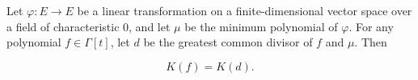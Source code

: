 Let $\varphi: E \to E$ be a linear transformation on a finite-dimensional vector space over a field of characteristic $0$, and let $\mu$ be the minimum polynomial of $\varphi$. For any polynomial $f \in \Gamma[t]$, let $d$ be the greatest common divisor of $f$ and $\mu$. Then

$$K(f) = K(d).$$
